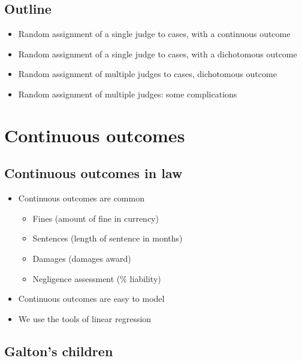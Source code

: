 \documentclass[12pt,twoside]{article}
\providecommand{\tightlist}{%
  \setlength{\itemsep}{0pt}\setlength{\parskip}{0pt}}
\begin{document}
\subsection{Outline}\label{outline}

\begin{itemize}
\tightlist
\item
  Random assignment of a single judge to cases, with a continuous
  outcome
\item
  Random assignment of a single judge to cases, with a dichotomous
  outcome
\item
  Random assignment of multiple judges to cases, dichotomous outcome
\item
  Random assignment of multiple judges: some complications
\end{itemize}

\section{Continuous outcomes}\label{continuous-outcomes}

\subsection{Continuous outcomes in
law}\label{continuous-outcomes-in-law}

\begin{itemize}
\tightlist
\item
  Continuous outcomes are common

  \begin{itemize}
  \tightlist
  \item
    Fines (amount of fine in currency)
  \item
    Sentences (length of sentence in months)
  \item
    Damages (damages award)
  \item
    Negligence assessment (\% liability)
  \end{itemize}
\item
  Continuous outcomes are easy to model
\item
  We use the tools of linear regression
\end{itemize}

\subsection{Galton's children}\label{galtons-children}
\end{document}
